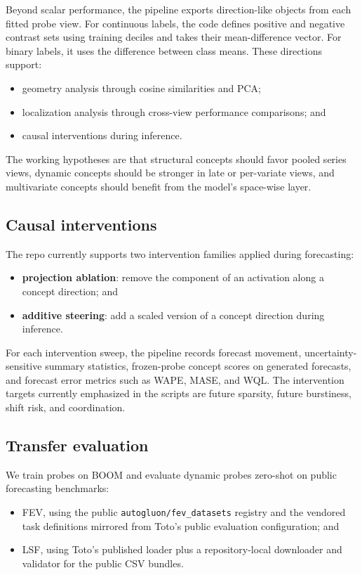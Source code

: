 \documentclass{article}
\newcommand{\boom}{\textsc{BOOM}}
\newcommand{\fev}{\textsc{FEV}}
\newcommand{\lsf}{\textsc{LSF}}
\begin{document}
Beyond scalar performance, the pipeline exports direction-like objects from each fitted probe view. For continuous labels, the code defines positive and negative contrast sets using training deciles and takes their mean-difference vector. For binary labels, it uses the difference between class means. These directions support:
\begin{itemize}[leftmargin=18pt]
\item geometry analysis through cosine similarities and PCA;
\item localization analysis through cross-view performance comparisons; and
\item causal interventions during inference.
\end{itemize}

The working hypotheses are that structural concepts should favor pooled series views, dynamic concepts should be stronger in late or per-variate views, and multivariate concepts should benefit from the model's space-wise layer.

\subsection{Causal interventions}

The repo currently supports two intervention families applied during forecasting:
\begin{itemize}[leftmargin=18pt]
\item \textbf{projection ablation}: remove the component of an activation along a concept direction; and
\item \textbf{additive steering}: add a scaled version of a concept direction during inference.
\end{itemize}

For each intervention sweep, the pipeline records forecast movement, uncertainty-sensitive summary statistics, frozen-probe concept scores on generated forecasts, and forecast error metrics such as WAPE, MASE, and WQL. The intervention targets currently emphasized in the scripts are future sparsity, future burstiness, shift risk, and coordination.

\subsection{Transfer evaluation}

We train probes on \boom{} and evaluate dynamic probes zero-shot on public forecasting benchmarks:
\begin{itemize}[leftmargin=18pt]
\item \fev{}, using the public \texttt{autogluon/fev\_datasets} registry and the vendored task definitions mirrored from Toto's public evaluation configuration; and
\item \lsf{}, using Toto's published loader plus a repository-local downloader and validator for the public CSV bundles.
\end{itemize}
\end{document}
